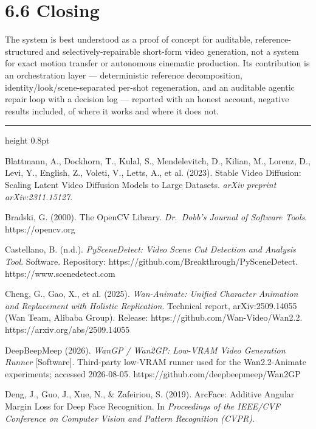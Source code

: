 \documentclass[10pt,twocolumn,letterpaper]{article}
\begin{document}
\section*{6.6 Closing}

The system is best understood as a proof of concept for auditable, reference-structured and selectively-repairable short-form video generation, not a system for exact motion transfer or autonomous cinematic production. Its contribution is an orchestration layer --- deterministic reference decomposition, identity/look/scene-separated per-shot regeneration, and an auditable agentic repair loop with a decision log --- reported with an honest account, negative results included, of where it works and where it does not.

\par\vspace{22pt}

\vspace*{2pt}\vspace{3pt}\hrule height 0.8pt\vspace{12pt}

Blattmann, A., Dockhorn, T., Kulal, S., Mendelevitch, D., Kilian, M., Lorenz, D., Levi, Y., English, Z., Voleti, V., Letts, A., et al. (2023). Stable Video Diffusion: Scaling Latent Video Diffusion Models to Large Datasets. \emph{arXiv preprint arXiv:2311.15127}.

Bradski, G. (2000). The OpenCV Library. \emph{Dr.\ Dobb's Journal of Software Tools}. https://opencv.org

Castellano, B. (n.d.). \emph{PySceneDetect: Video Scene Cut Detection and Analysis Tool}. Software. Repository: https://github.com/Breakthrough/PySceneDetect. https://www.scenedetect.com

Cheng, G., Gao, X., et al. (2025). \emph{Wan-Animate: Unified Character Animation and Replacement with Holistic Replication}. Technical report, arXiv:2509.14055 (Wan Team, Alibaba Group). Release: https://github.com/Wan-Video/Wan2.2. https://arxiv.org/abs/2509.14055

DeepBeepMeep (2026). \emph{WanGP / Wan2GP: Low-VRAM Video Generation Runner} [Software]. Third-party low-VRAM runner used for the Wan2.2-Animate experiments; accessed 2026-08-05. https://github.com/deepbeepmeep/Wan2GP

Deng, J., Guo, J., Xue, N., \& Zafeiriou, S. (2019). ArcFace: Additive Angular Margin Loss for Deep Face Recognition. In \emph{Proceedings of the IEEE/CVF Conference on Computer Vision and Pattern Recognition (CVPR)}.
\end{document}
